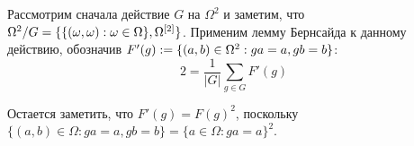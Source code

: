 \begin{solution}
	Рассмотрим сначала действие $G$ на $\Omega^2$ и заметим, что $\Omega^2 / G = \{\{(\omega, \omega): \omega \hm\in \Omega\}, \Omega^{[2]}\}$. Применим лемму Бернсайда к данному действию, обозначив $F'(g) := \{(a, b) \hm\in \Omega^2: ga = a, gb = b\}$:
	\[2 = \frac{1}{|G|}\sum\limits_{g \in G}F'(g)\]
	
	Остается заметить, что $F'(g) = F(g)^2$, поскольку $\{(a, b) \in \Omega: ga = a, gb = b\} = \{a \in \Omega: ga = a\}^2$.
\end{solution}